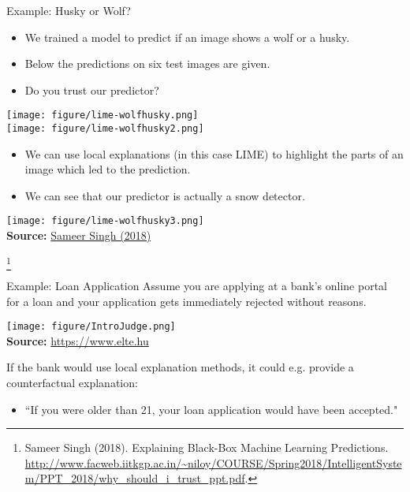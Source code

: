\documentclass[11pt,compress,t,notes=noshow, aspectratio=169, xcolor=table]{beamer}
\begin{document}
\begin{vbframe}[allowframebreaks]{Example: Husky or Wolf?}
	\begin{itemize}
		\item We trained a model to predict if an image shows a wolf or a husky. 
		\item Below the predictions on six test images are given. 
		\item Do you trust our predictor? 
	\end{itemize}
	\begin{center}
		\texttt{[image: figure/lime-wolfhusky.png]}\\
		\texttt{[image: figure/lime-wolfhusky2.png]}\\
	\end{center}
	
	\begin{itemize}
		\item We can use local explanations (in this case LIME) to highlight the parts of an image which led to the prediction.
		\item We can see that our predictor is actually a snow detector. 
	\end{itemize}
	\begin{center}
		\texttt{[image: figure/lime-wolfhusky3.png]}\\
		{\tiny \textbf{Source:} \href{http://www.facweb.iitkgp.ac.in/~niloy/COURSE/Spring2018/IntelligentSystem/PPT_2018/why_should_i_trust_ppt.pdf}{Sameer Singh (2018)}}
	\end{center}
\footnote[frame]{Sameer Singh (2018). Explaining Black-Box Machine Learning Predictions.  \url{http://www.facweb.iitkgp.ac.in/~niloy/COURSE/Spring2018/IntelligentSystem/PPT_2018/why_should_i_trust_ppt.pdf}.}
\end{vbframe}

\begin{vbframe}{Example: Loan Application}
Assume you are applying at a bank's online portal for a loan and your application gets immediately rejected without reasons.
	\begin{center}
		\texttt{[image: figure/IntroJudge.png]}\\
		{\tiny \textbf{Source:} \href{https://www.elte.hu/content/trendfordulo-az-mi-fejlesztesekben.t.19025}{https://www.elte.hu}}
	\end{center}
	If the bank would use local explanation methods, it could e.g. provide a counterfactual explanation:
	\begin{itemize}
	    \item[] ``If you were older than 21, your loan application would have been accepted."
	\end{itemize}
\end{vbframe}
\end{document}
